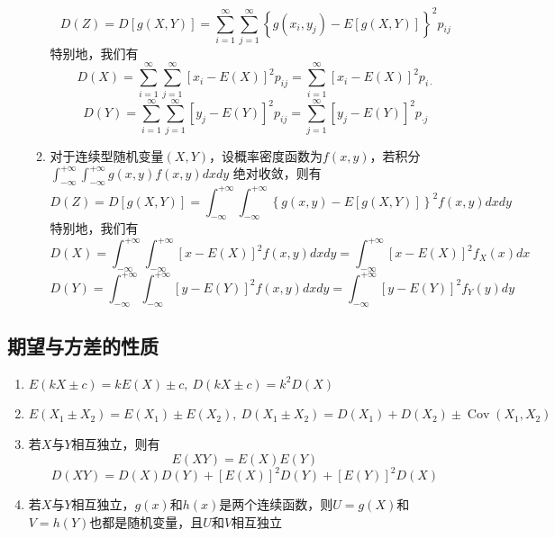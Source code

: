 \documentclass[12pt,a4paper,UTF8]{book}
\begin{document}
\begin{enumerate}
\begin{enumerate}
\[D\left(Z\right)=D\left[g\left(X,Y\right)\right]=\sum\limits_{i=1}^{\infty}\sum\limits_{j=1}^{\infty}\left\{g\left(x_i,y_j\right)-E\left[g\left(X,Y\right)\right]\right\}^2p_{ij}\]
特别地，我们有
\[D\left(X\right)=\sum\limits_{i=1}^{\infty}\sum\limits_{j=1}^{\infty}\left[x_i-E\left(X\right)\right]^2p_{ij}=\sum\limits_{i=1}^{\infty}\left[x_i-E\left(X\right)\right]^2p_{i\cdot}\]
\[D\left(Y\right)=\sum\limits_{i=1}^{\infty}\sum\limits_{j=1}^{\infty}\left[y_j-E\left(Y\right)\right]^2p_{ij}=\sum\limits_{j=1}^{\infty}\left[y_j-E\left(Y\right)\right]^2p_{\cdot j}\]
\item 对于连续型随机变量$\left(X,Y\right)$，设概率密度函数为$f\left(x,y\right)$，若积分$\int_{-\infty}^{+\infty}\int_{-\infty}^{+\infty}g\left(x,y\right)f\left(x,y\right)dxdy$ 绝对收敛，则有
\[D\left(Z\right)=D\left[g\left(X,Y\right)\right]=\int_{-\infty}^{+\infty}\int_{-\infty}^{+\infty}\left\{g\left(x,y\right)-E\left[g\left(X,Y\right)\right]\right\}^2f\left(x,y\right)dxdy\]
特别地，我们有
\[D\left(X\right)=\int_{-\infty}^{+\infty}\int_{-\infty}^{+\infty}\left[x-E\left(X\right)\right]^2f\left(x,y\right)dxdy=\int_{-\infty}^{+\infty}\left[x-E\left(X\right)\right]^2f_X\left(x\right)dx\]
\[D\left(Y\right)=\int_{-\infty}^{+\infty}\int_{-\infty}^{+\infty}\left[y-E\left(Y\right)\right]^2f\left(x,y\right)dxdy=\int_{-\infty}^{+\infty}\left[y-E\left(Y\right)\right]^2f_Y\left(y\right)dy\]
\end{enumerate}
\end{enumerate}

\subsection{期望与方差的性质}
\begin{enumerate}
\item $E\left(kX\pm c\right)=kE\left(X\right)\pm c,\ D\left(kX\pm c\right)=k^2D\left(X\right)$
\item $E\left(X_1\pm X_2\right)=E\left(X_1\right)\pm E\left(X_2\right),\ D\left(X_1\pm X_2\right)=D\left(X_1\right)+D\left(X_2\right)\pm\operatorname{Cov}\left(X_1,X_2\right)$
\item 若$X$与$Y$相互独立，则有
\[E\left(XY\right)=E\left(X\right)E\left(Y\right)\]
\[D\left(XY\right)=D\left(X\right)D\left(Y\right)+\left[E\left(X\right)\right]^2D\left(Y\right)+\left[E\left(Y\right)\right]^2D\left(X\right)\]
\item 若$X$与$Y$相互独立，$g\left(x\right)$和$h\left(x\right)$是两个连续函数，则$U=g\left(X\right)$和$V=h\left(Y\right)$也都是随机变量，且$U$和$V$相互独立
\end{enumerate}
\end{document}
